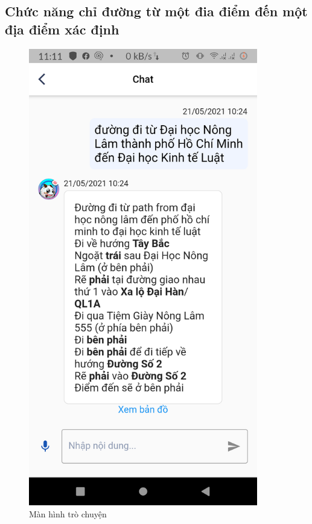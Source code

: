 \subsection{Chức năng chỉ đường từ một đia điểm đến một địa điểm xác định}
\begin{figure}[htp]
    \centering
    \includegraphics[width=10cm]{images/Screen-chat.png}
    \caption{Màn hình trò chuyện}
    \label{fig:screen-chat}
\end{figure}


